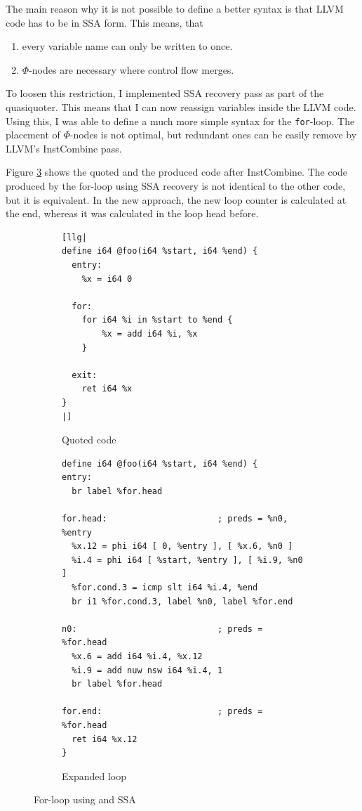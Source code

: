 \documentclass[a4paper,bibliography=totocnumbered,parskip,headsepline]{scrbook}
\begin{document}
The main reason why it is not possible to define a better syntax is that LLVM code has to be in SSA form.
This means, that
\begin{enumerate}[noitemsep]
 \item every variable name can only be written to once.
 \item $\Phi$-nodes are necessary where control flow merges.
\end{enumerate}

To loosen this restriction, I implemented SSA recovery pass as part of the quasiquoter.
This means that I can now reassign variables inside the LLVM code.
Using this, I was able to define a much more simple syntax for the \lstinline{for}-loop.
The placement of $\Phi$-nodes is not optimal, but redundant ones can be easily remove by LLVM's InstCombine pass.

Figure \ref{fig:forquoteSSA} shows the quoted and the produced code after InstCombine.
The code produced by the for-loop using SSA recovery is not identical to the other code, but it is equivalent.
In the new approach, the new loop counter is calculated at the end, whereas it was calculated in the loop head before.

\begin{figure}
\begin{subfigure}{\textwidth}
\begin{lstlisting}
[llg|
define i64 @foo(i64 %start, i64 %end) {
  entry:
    %x = i64 0

  for:
    for i64 %i in %start to %end {
        %x = add i64 %i, %x
    }

  exit:
    ret i64 %x
}
|]
\end{lstlisting}
\caption{Quoted code}
\label{fig:forquoteSSA1}
\end{subfigure}

\begin{subfigure}{\textwidth}
\begin{lstlisting}
define i64 @foo(i64 %start, i64 %end) {
entry:
  br label %for.head

for.head:                      ; preds = %n0, %entry
  %x.12 = phi i64 [ 0, %entry ], [ %x.6, %n0 ]
  %i.4 = phi i64 [ %start, %entry ], [ %i.9, %n0 ]
  %for.cond.3 = icmp slt i64 %i.4, %end
  br i1 %for.cond.3, label %n0, label %for.end

n0:                            ; preds = %for.head
  %x.6 = add i64 %i.4, %x.12
  %i.9 = add nuw nsw i64 %i.4, 1
  br label %for.head

for.end:                       ; preds = %for.head
  ret i64 %x.12
}
\end{lstlisting}
\caption{Expanded loop}
\label{fig:forquoteSSA2}
\end{subfigure}
\caption{For-loop using  and SSA}
\label{fig:forquoteSSA}
\end{figure}
\end{document}
